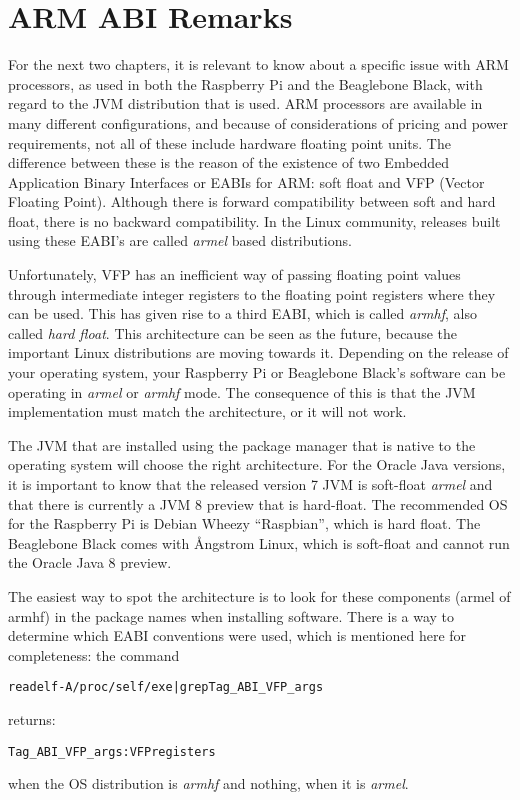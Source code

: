 \chapter{ARM ABI Remarks}
For the next two chapters, it is relevant to know about a specific issue with ARM processors, as used in both the Raspberry Pi and the Beaglebone Black, with regard to the JVM distribution that is used. ARM processors are available in many different configurations, and because of considerations of pricing and power requirements, not all of these include hardware floating point units. The difference between these is the reason of the existence of two Embedded Application Binary Interfaces or EABIs for ARM: soft float and VFP (Vector Floating Point).  Although there is forward compatibility between soft and hard float, there is no backward compatibility. In the Linux community, releases built using  these EABI's are called \emph{armel} based distributions. 

Unfortunately, VFP has an inefficient way of passing floating point values through intermediate integer registers to the floating point registers where they can be used. This has given rise to a third EABI, which is called \emph{armhf}, also called \emph{hard float}. This architecture can be seen as the future, because the important Linux distributions are moving towards it. Depending on the release of your operating system, your Raspberry Pi or Beaglebone Black's software can be operating in \emph{armel} or \emph{armhf} mode. The consequence of this is that the JVM implementation must match the architecture, or it will not work.

The JVM that are installed using the package manager that is native to the operating system will choose the right architecture. For the Oracle Java versions, it is important to know that the released version 7 JVM is soft-float \emph{armel} and that there is currently a JVM 8 preview that is hard-float. The recommended OS for the Raspberry Pi is Debian Wheezy ``Raspbian'', which is hard float. The Beaglebone Black comes with Ångstrom Linux, which is soft-float and cannot run the Oracle Java 8 preview.

The easiest way to spot the architecture is to look for these components (armel of armhf) in the package names when installing software. There is a way to determine which EABI conventions were used, which is mentioned here for completeness: the command
\begin{alltt}
readelf -A /proc/self/exe | grep Tag_ABI_VFP_args
\end{alltt}
returns:
\begin{alltt}
Tag_ABI_VFP_args: VFP registers
\end{alltt}
when the OS distribution is \emph{armhf} and nothing, when it is \emph{armel}.